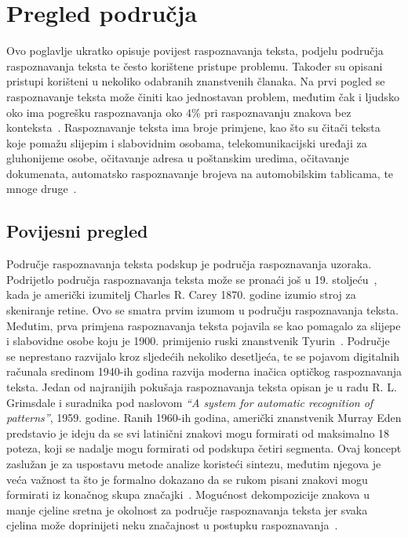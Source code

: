 \chapter{Pregled područja}
\label{ch:pregled-podrucja}
Ovo poglavlje ukratko opisuje povijest raspoznavanja teksta, podjelu područja raspoznavanja teksta te često korištene
pristupe problemu. Također su opisani pristupi korišteni u nekoliko odabranih znanstvenih članaka. Na prvi pogled se
raspoznavanje teksta može činiti kao jednostavan problem, međutim čak i ljudsko oko ima pogrešku raspoznavanja oko $4\%$
pri raspoznavanju znakova bez konteksta\ \citep{mantas1986}. Raspoznavanje teksta ima broje primjene, kao što su čitači
teksta koje pomažu slijepim i slabovidnim osobama, telekomunikacijski uređaji za gluhonijeme osobe, očitavanje adresa u
poštanskim uredima, očitavanje dokumenata, automatsko raspoznavanje brojeva na automobilskim tablicama, te mnoge
druge\ \citep{govindan1989}.


\section{Povijesni pregled}
\label{sec:povijesni-pregled}
Područje raspoznavanja teksta podskup je područja raspoznavanja uzoraka. Podrijetlo područja raspoznavanja teksta može
se pronaći još u 19. stoljeću\ \citep{mantas1986}, kada je američki izumitelj Charles R. Carey 1870. godine izumio stroj
za skeniranje retine. Ovo se smatra prvim izumom u području raspoznavanja teksta. Međutim, prva primjena raspoznavanja
teksta pojavila se kao pomagalo za slijepe i slabovidne osobe koju je 1900. primijenio ruski znanstvenik
Tyurin\ \citep{govindan1989}. Područje se neprestano razvijalo kroz sljedećih nekoliko desetljeća, te se pojavom
digitalnih računala sredinom 1940-ih godina razvija moderna inačica optičkog raspoznavanja teksta. Jedan od najranijih
pokušaja raspoznavanja teksta opisan je u radu R. L. Grimsdale i suradnika pod naslovom
\emph{``A system for automatic recognition of patterns''}, 1959. godine. Ranih 1960-ih godina, američki znanstvenik
Murray Eden predstavio je ideju da se svi latinični znakovi mogu formirati od maksimalno 18 poteza, koji se nadalje mogu
formirati od podskupa četiri segmenta. Ovaj koncept zaslužan je za uspostavu metode analize koristeći sintezu, međutim
njegova je veća važnost ta što je formalno dokazano da se rukom pisani znakovi mogu formirati iz konačnog skupa
značajki\ \citep{mantas1986}. Mogućnost dekompozicije znakova u manje cjeline sretna je okolnost za područje
raspoznavanja teksta jer svaka cjelina može doprinijeti neku značajnost u postupku raspoznavanja\ \citep{mori1999}.


